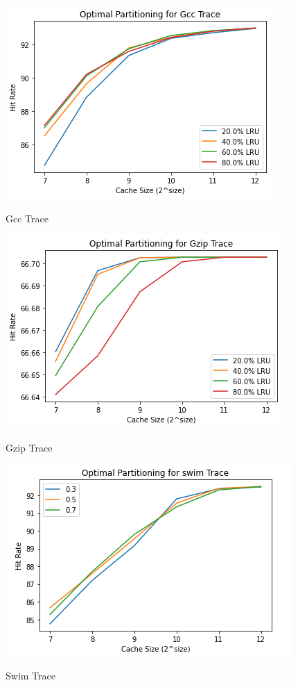 \documentclass[conference]{IEEEtran}
\begin{document}
 \begin{figure}
        \centering
       \includegraphics[scale=0.6]{gcc_partition.png}~
       \caption{Gcc Trace}\label{Fig:1}
 \end{figure}

 \begin{figure}
        \centering
       \includegraphics[scale=0.6]{gzip_partition.png}~
       \caption{Gzip Trace}\label{Fig:1}
 \end{figure}

 \begin{figure}
        \centering
       \includegraphics[scale=0.8]{swim_partition.png}~
       \caption{Swim Trace}\label{Fig:1}
 \end{figure}
\end{document}

